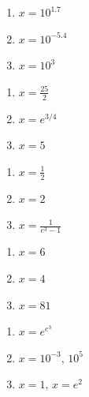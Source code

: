 \begin{multicols}{3}
\begin{enumerate}
\setcounter{enumi}{\value{HW}}

\item $x = 10^{1.7}$
\item $x = 10^{-5.4}$
\item $x = 10^{3}$

\setcounter{HW}{\value{enumi}}
\end{enumerate}
\end{multicols}

\begin{multicols}{3}
\begin{enumerate}
\setcounter{enumi}{\value{HW}}

\item $x=\frac{25}{2}$
\item $x=e^{3/4}$
\item $x = 5$

\setcounter{HW}{\value{enumi}}
\end{enumerate}
\end{multicols}

\begin{multicols}{3}
\begin{enumerate}
\setcounter{enumi}{\value{HW}}

\item $x = \frac{1}{2}$
\item $x = 2$
\item $x = \frac{1}{e^3-1}$

\setcounter{HW}{\value{enumi}}
\end{enumerate}
\end{multicols}

\begin{multicols}{3}
\begin{enumerate}
\setcounter{enumi}{\value{HW}}

\item $x=6$
\item $x=4$
\item $x = 81$

\setcounter{HW}{\value{enumi}}
\end{enumerate}
\end{multicols}

\begin{multicols}{3}
\begin{enumerate}
\setcounter{enumi}{\value{HW}}

\item $x = e^{e^3}$
\item $x=10^{-3}, \, 10^{5}$
\item $x = 1, \, x = e^{2}$

\setcounter{HW}{\value{enumi}}
\end{enumerate}
\end{multicols}

